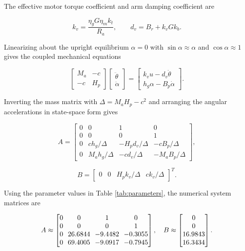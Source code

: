 \documentclass[conference]{IEEEtran}
\begin{document}
The effective motor torque coefficient and arm damping coefficient are

\begin{equation}
k_v=\frac{\eta_gG\eta_mk_t}{R_a},\qquad
d_v=B_r+k_vGk_b.
\label{eq:motor}
\end{equation}

Linearizing about the upright equilibrium $\alpha=0$ with $\sin\alpha\approx\alpha$ and $\cos\alpha\approx1$ gives the coupled mechanical equations

\begin{equation}
\begin{bmatrix}M_a&-c\\-c&H_p\end{bmatrix}
\begin{bmatrix}\ddot\theta\\\ddot\alpha\end{bmatrix}
=\begin{bmatrix}k_vu-d_v\dot\theta\\h_g\alpha-B_p\dot\alpha\end{bmatrix}.
\label{eq:mechanics}
\end{equation}

Inverting the mass matrix with $\Delta=M_aH_p-c^2$ and arranging the angular accelerations in state-space form gives

\begin{equation}
A=\begin{bmatrix}
0&0&1&0\\
0&0&0&1\\
0&ch_g/\Delta&-H_pd_v/\Delta&-cB_p/\Delta\\
0&M_ah_g/\Delta&-cd_v/\Delta&-M_aB_p/\Delta
\end{bmatrix},
\label{eq:Asymbolic}
\end{equation}

\begin{equation}
B=\begin{bmatrix}0&0&H_pk_v/\Delta&ck_v/\Delta\end{bmatrix}^{T}.
\label{eq:Bsymbolic}
\end{equation}

Using the parameter values in Table \ref{tab:parameters}, the numerical system matrices are

\begin{equation}
\setlength{\arraycolsep}{3.5pt}
A\approx\begin{bmatrix}
0&0&1&0\\
0&0&0&1\\
0&26.6844&-9.4482&-0.3055\\
0&69.4005&-9.0917&-0.7945
\end{bmatrix},\quad
B\approx\begin{bmatrix}0\\0\\16.9843\\16.3434\end{bmatrix}.
\label{eq:ABnumerical}
\end{equation}
\end{document}
